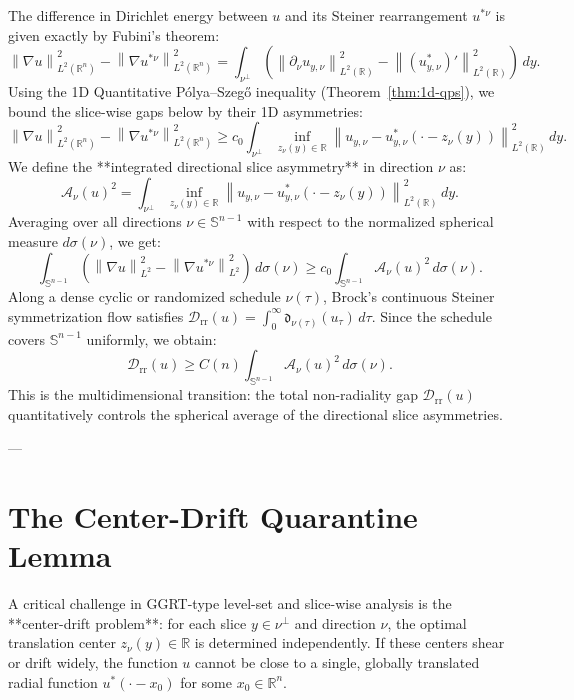 \documentclass[11pt]{article}
\theoremstyle{definition}
\newcommand{\R}{\mathbb R}
\newcommand{\Drr}{\mathcal D_{\mathrm{rr}}}
\newcommand{\Sph}{\mathbb S^{n-1}}
\newcommand{\norm}[1]{\left\|#1\right\|}
\begin{document}
The difference in Dirichlet energy between $u$ and its Steiner rearrangement $u^{*\nu}$ is given exactly by Fubini's theorem:
\begin{equation}
\norm{\nabla u}_{L^2(\R^n)}^2 - \norm{\nabla u^{*\nu}}_{L^2(\R^n)}^2 = \int_{\nu^\perp} \left( \norm{\partial_\nu u_{y,\nu}}_{L^2(\R)}^2 - \norm{(u_{y,\nu}^*)'}_{L^2(\R)}^2 \right) \, dy.
\end{equation}
Using the 1D Quantitative Pólya--Szegő inequality (Theorem~\ref{thm:1d-qps}), we bound the slice-wise gaps below by their 1D asymmetries:
\begin{equation}
\norm{\nabla u}_{L^2(\R^n)}^2 - \norm{\nabla u^{*\nu}}_{L^2(\R^n)}^2 \ge c_0 \int_{\nu^\perp} \inf_{z_\nu(y) \in \R} \norm{u_{y,\nu} - u_{y,\nu}^*(\cdot - z_\nu(y))}_{L^2(\R)}^2 \, dy.
\end{equation}
We define the **integrated directional slice asymmetry** in direction $\nu$ as:
\begin{equation}
\mathcal{A}_\nu(u)^2 = \int_{\nu^\perp} \inf_{z_\nu(y) \in \R} \norm{u_{y,\nu} - u_{y,\nu}^*(\cdot - z_\nu(y))}_{L^2(\R)}^2 \, dy.
\end{equation}
Averaging over all directions $\nu \in \Sph$ with respect to the normalized spherical measure $d\sigma(\nu)$, we get:
\begin{equation}
\int_{\Sph} \left( \norm{\nabla u}_{L^2}^2 - \norm{\nabla u^{*\nu}}_{L^2}^2 \right) \, d\sigma(\nu) \ge c_0 \int_{\Sph} \mathcal{A}_\nu(u)^2 \, d\sigma(\nu).
\end{equation}
Along a dense cyclic or randomized schedule $\nu(\tau)$, Brock's continuous Steiner symmetrization flow satisfies $\Drr(u) = \int_0^\infty \mathfrak{d}_{\nu(\tau)}(u_\tau) \, d\tau$. Since the schedule covers $\Sph$ uniformly, we obtain:
\begin{equation}
\Drr(u) \ge C(n) \int_{\Sph} \mathcal{A}_\nu(u)^2 \, d\sigma(\nu).
\end{equation}
This is the multidimensional transition: the total non-radiality gap $\Drr(u)$ quantitatively controls the spherical average of the directional slice asymmetries.

---

\section{The Center-Drift Quarantine Lemma}

A critical challenge in GGRT-type level-set and slice-wise analysis is the **center-drift problem**: for each slice $y \in \nu^\perp$ and direction $\nu$, the optimal translation center $z_\nu(y) \in \R$ is determined independently. If these centers shear or drift widely, the function $u$ cannot be close to a single, globally translated radial function $u^*(\cdot - x_0)$ for some $x_0 \in \R^n$.
\end{document}
